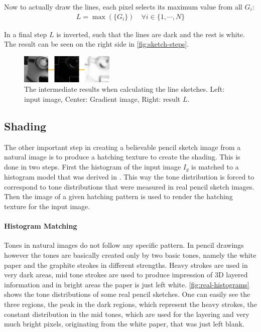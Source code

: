 Now to actually draw the lines, each pixel selects its maximum value from all
$G_i$:
\begin{align*}
 L = \max(\lbrace G_i\rbrace) \quad \forall i \in  \lbrace1,\cdots,N\rbrace
\end{align*}

In a final step $L$ is inverted, such that the lines are dark and the rest is
white. The result can be seen on the right side in \autoref{fig:sketch-steps}.

\begin{figure}[htb]
  \centering
  \includegraphics[width=0.4\textwidth]{images/sketch-steps.png}
  \caption{The intermediate results when calculating the line sketches. Left:
  input image, Center: Gradient image, Right: result $L$.}
  \label{fig:sketch-steps}
\end{figure}

\subsection{Shading}
The other important step in creating a believable pencil sketch image from a
natural image is to produce a hatching texture to create the shading. This is
done in two steps. First the histogram of the input image $I_g$ is matched to a
histogram model that was derived in \cite{mainPaper}. This way the tone
distribution is forced to correspond to tone distributions that were measured in
real pencil sketch images. Then the image of a given hatching pattern is used to
render the hatching texture for the input image. 

\paragraph{Histogram Matching}
Tones in natural images do not follow any specific pattern. In pencil drawings
however the tones are basically created only by two basic tones, namely the
white paper and the graphite strokes in different strengths. Heavy strokes are
used in very dark areas, mid tone strokes are used to produce impression of 3D
layered information and in bright areas the paper is just left white.
\autoref{fig:real-histograms} shows the tone distributions of some real pencil
sketches. One can easily see the three regions, the peak in the dark regions,
which represent the heavy strokes, the constant distribution in the mid tones,
which are used for the layering and very much bright pixels, originating from
the white paper, that was just left blank.

